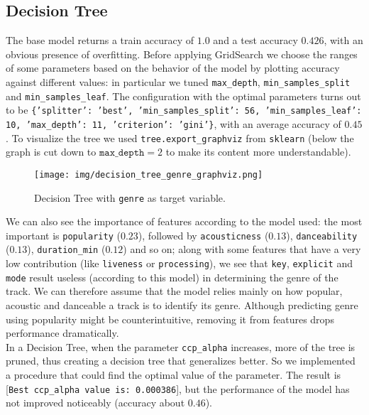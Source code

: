 \subsection{Decision Tree}
The base model returns a train accuracy of $1.0$ and a 
test accuracy $0.426$, with an obvious presence of overfitting. Before applying GridSearch we choose the ranges of some parameters based on the behavior of the model by plotting accuracy against different values: in particular we tuned \texttt{max\_depth}, \texttt{min\_samples\_split} and \texttt{min\_samples\_leaf}. The configuration with the optimal parameters turns out to be \texttt{\{'splitter': 'best', 'min\_samples\_split': 56, 'min\_samples\_leaf': 10, 'max\_depth': 11, 'criterion': 'gini'\}}, with an average accuracy of $0.45$. To visualize the tree we used \texttt{tree.export\_graphviz} from \texttt{sklearn} (below the graph is cut down to $\texttt{max\_depth}=2$ to make its content more understandable).
\begin{figure}[H]
    \centering
    \texttt{[image: img/decision\_tree\_genre\_graphviz.png]}
    \caption{Decision Tree with \texttt{genre} as target variable.}
    \label{fig:enter-label}
\end{figure}
\noindent We can also see the importance of features according to the model used: the most important is \texttt{popularity} ($0.23$), followed by \texttt{acousticness} ($0.13$), \texttt{danceability} ($0.13$), \texttt{duration\_min} ($0.12$) and so on; along with some features that have a very low contribution (like \texttt{liveness} or \texttt{processing}), we see that \texttt{key}, \texttt{explicit} and \texttt{mode} result useless (according to this model) in determining the genre of the track. We can therefore assume that the model relies mainly on how popular, acoustic and danceable a track is to identify its genre. Although predicting genre using popularity might be counterintuitive, removing it from features drops performance dramatically.\\ In a Decision Tree, when the parameter \texttt{ccp\_alpha} increases, more of the tree is pruned, thus creating a decision tree that generalizes better. So we implemented a procedure that could find the optimal value of the parameter. The result is [\texttt{Best ccp\_alpha value is:  0.000386}], but the performance of the model has not improved noticeably (accuracy about $0.46$).\\
